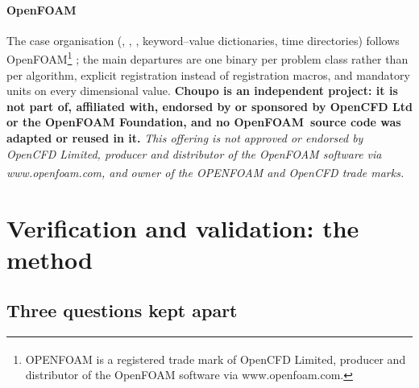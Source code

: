 \documentclass[preprint,12pt]{elsarticle}
\newcommand{\code}[1]{\texttt{\detokenize{#1}}}
\newcommand{\OF}{OpenFOAM}
\begin{document}
\paragraph{\OF}  The case organisation (\code{system/}, \code{constant/},
\code{0/}, keyword--value dictionaries, time directories) follows
\OF\textsuperscript{\textregistered}\footnote{OPENFOAM\textsuperscript{\textregistered}
is a registered trade mark of OpenCFD Limited, producer and distributor of
the OpenFOAM software via www.openfoam.com.} \citep{weller1998}; the main
departures are one binary per problem class rather than per algorithm,
explicit registration instead of registration macros, and mandatory units
on every dimensional value.  \textbf{Choupo is an independent project: it
is not part of, affiliated with, endorsed by or sponsored by OpenCFD Ltd
or the OpenFOAM Foundation, and no \OF\ source code was adapted or reused
in it.}  \emph{This offering is not approved or endorsed by OpenCFD
Limited, producer and distributor of the OpenFOAM software via
www.openfoam.com, and owner of the OPENFOAM\textsuperscript{\textregistered}
and OpenCFD\textsuperscript{\textregistered} trade marks.}

\section{Verification and validation: the method}
\label{sec:vv}

\subsection{Three questions kept apart}
\label{sec:vv-three}
\end{document}
